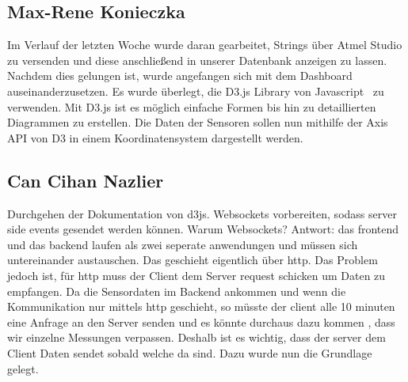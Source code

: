 \documentclass[]{article}
\begin{document}
\subsection{Max-Rene Konieczka}
Im Verlauf der letzten Woche wurde daran gearbeitet, Strings über Atmel Studio zu versenden und diese anschließend in unserer Datenbank anzeigen zu lassen. Nachdem dies gelungen ist, wurde angefangen sich mit dem Dashboard auseinanderzusetzen. Es wurde überlegt, die D3.js Library von Javascript~\cite{D3JS} zu verwenden. Mit D3.js ist es möglich einfache Formen bis hin zu detaillierten Diagrammen zu erstellen.
Die Daten der Sensoren sollen nun mithilfe der Axis API von D3 in einem Koordinatensystem dargestellt werden. 
\subsection{Can Cihan Nazlier}
Durchgehen der Dokumentation von d3js. Websockets vorbereiten, sodass server side events gesendet werden können. Warum Websockets?
Antwort: das frontend und das backend laufen als zwei seperate anwendungen und müssen sich untereinander austauschen. Das geschieht eigentlich über http. Das Problem jedoch ist,
für http muss der Client dem Server request schicken um Daten zu empfangen. Da die Sensordaten im Backend ankommen und wenn die Kommunikation nur mittels http geschieht, so müsste der client alle 10 minuten eine Anfrage an den Server senden und es könnte durchaus dazu kommen , dass wir einzelne Messungen verpassen. Deshalb ist es wichtig, dass der server dem Client Daten sendet sobald welche da sind. Dazu wurde nun die Grundlage gelegt. 


\printbibliography
\end{document}
